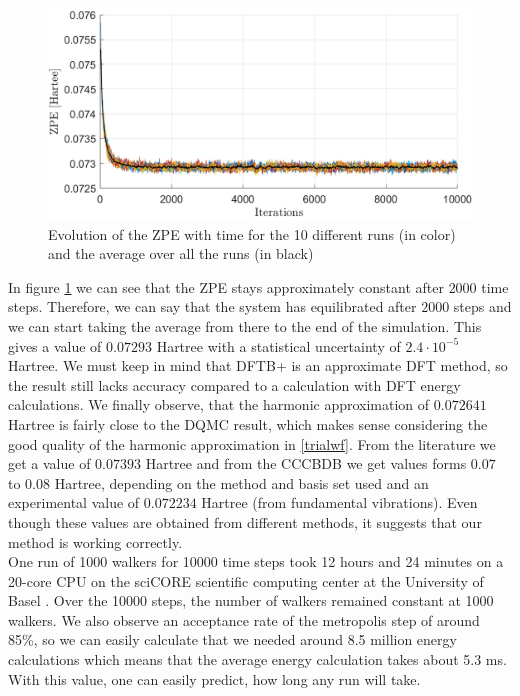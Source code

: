 \documentclass [12pt]{report}
\begin{document}
\begin{figure}[h!]
\includegraphics[width=\linewidth] {c2h6_1.png}
\caption{Evolution of the ZPE with time for the 10 different runs (in color) and the average over all the runs (in black)} \label{c2h6_1}
\end{figure}
In figure \ref{c2h6_1} we can see that the ZPE stays approximately constant after $2000$ time steps. Therefore, we can say that the system has equilibrated after $2000$ steps and we can start taking the average from there to the end of the simulation. This gives a value of $0.07293$ Hartree with a statistical uncertainty  of $2.4 \cdot 10^{-5}$ Hartree. We must keep in mind that DFTB+ is an approximate DFT method, so the result still lacks accuracy compared to a calculation with DFT energy calculations. We finally observe, that the harmonic approximation of $0.072641$ Hartree is fairly close to the DQMC result, which makes sense considering the good quality of the harmonic approximation in \ref{trialwf}. From the literature \cite{c2h6} we get a value of $0.07393$ Hartree and from the CCCBDB \cite{cccbdb} we get values forms $0.07$ to $0.08$ Hartree, depending on the method and basis set used and an experimental value of $0.072234$ Hartree (from fundamental vibrations). Even though these values are obtained from different methods, it suggests that our method is working correctly.\\
One run of 1000 walkers for 10000 time steps took 12 hours and 24 minutes on a 20-core CPU on the sciCORE scientific computing center at the University of Basel \cite{http://scicore.unibas.ch/}. Over the 10000 steps, the number of walkers remained constant at 1000 walkers.  We also observe an acceptance rate of the metropolis step of around 85\%, so we can easily calculate that we needed around 8.5 million energy calculations which means that the average energy calculation takes about 5.3 ms. With this value, one can easily predict, how long any run will take. 
\end{document}
